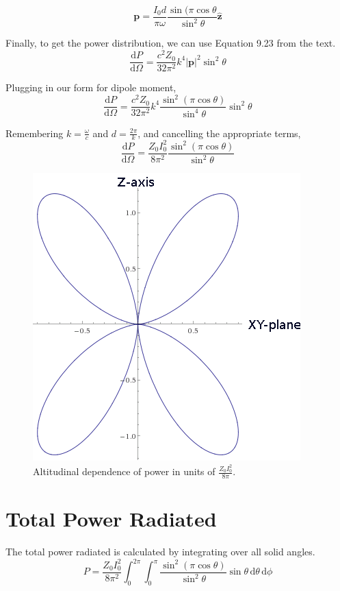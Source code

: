 \documentclass[10pt,a4paper]{article}
\begin{document}
\begin{equation}
\mathbf{p}=\frac{I_0 d}{\pi\omega}\frac{\sin(\pi\cos\theta}{\sin^2\theta}\hat{\mathbf{z}}
\end{equation}

Finally, to get the power distribution, we can use Equation 9.23 from the text.
\begin{equation}
\frac{\mathrm{d}P}{\mathrm{d}\Omega}= \frac{c^2 Z_0}{32 \pi^2}k^4|\mathbf{p}|^2\sin^2\theta
\end{equation}

Plugging in our form for dipole moment,
\begin{equation}
\frac{\mathrm{d}P}{\mathrm{d}\Omega}= \frac{c^2 Z_0}{32 \pi^2}k^4\frac{\sin^2(\pi\cos\theta)}{\sin^4\theta}\sin^2\theta
\end{equation}

Remembering $k=\frac{\omega}{c}$ and $d=\frac{2\pi}{k}$, and cancelling the appropriate terms,
\begin{equation}
\frac{\mathrm{d}P}{\mathrm{d}\Omega}=\frac{Z_0I_0^2}{8\pi^2}\frac{\sin^2(\pi\cos\theta)}{\sin^2\theta}
\end{equation}


\begin{figure}[hbtpf]
\caption{Altitudinal dependence of power in units of $\frac{Z_0I_0^2}{8\pi}$.}
\includegraphics[scale=1]{Jackson9-16-plot.png}
\end{figure}


\section{Total Power Radiated}
The total power radiated is calculated by integrating over all solid angles.
\begin{equation}
P=\frac{Z_0I_0^2}{8\pi^2}\int_0^{2\pi}\int_0^\pi
\frac{\sin^2(\pi\cos\theta)}{\sin^2\theta}
\sin\theta\, \mathrm{d}\theta \, \mathrm{d}\phi
\end{equation}
\end{document}
